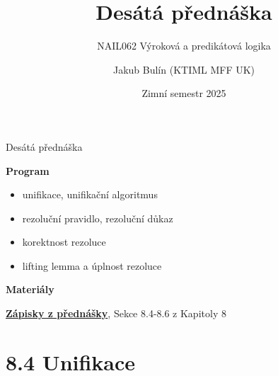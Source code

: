 \documentclass{beamer}
\title{Desátá přednáška}
\subtitle{NAIL062 Výroková a predikátová logika}
\author{Jakub Bulín (KTIML MFF UK)}
\date{Zimní semestr 2025}
\begin{document}
\maketitle


\begin{frame}{Desátá přednáška}

    \textbf{Program}
        \begin{itemize}            
            \item unifikace, unifikační algoritmus
            \item rezoluční pravidlo, rezoluční důkaz
            \item korektnost rezoluce
            \item lifting lemma a úplnost rezoluce
        \end{itemize}    

    \textbf{Materiály}

        \href{https://github.com/jbulin-mff-uk/nail062/raw/main/lecture/lecture-notes/lecture-notes.pdf}{\alert{\textbf{Zápisky z přednášky}}}, Sekce 8.4-8.6 z Kapitoly 8

\end{frame}


\section{8.4 Unifikace}
\end{document}
